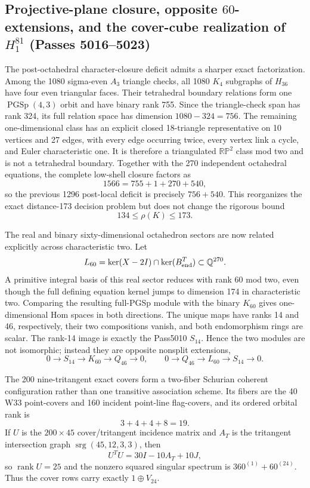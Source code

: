 \subsection*{Projective-plane closure, opposite $60$-extensions, and the cover-cube realization of $H_1^{81}$ (Passes 5016--5023)}
The post-octahedral character-closure deficit admits a sharper exact factorization.  Among the 1080 sigma-even $A_3$ triangle checks, all 1080 $K_4$ subgraphs of $H_{36}$ have four even triangular faces.  Their tetrahedral boundary relations form one $\operatorname{PGSp}(4,3)$ orbit and have binary rank 755.  Since the triangle-check span has rank 324, its full relation space has dimension $1080-324=756$.  The remaining one-dimensional class has an explicit closed 18-triangle representative on 10 vertices and 27 edges, with every edge occurring twice, every vertex link a cycle, and Euler characteristic one.  It is therefore a triangulated $\mathbb{RP}^2$ class mod two and is not a tetrahedral boundary.  Together with the 270 independent octahedral equations, the complete low-shell closure factors as
\[
1566=755+1+270+540,
\]
so the previous 1296 post-local deficit is precisely $756+540$.  This reorganizes the exact distance-173 decision problem but does not change the rigorous bound
\[
134\leq\rho(K)\leq173.
\]

The real and binary sixty-dimensional octahedron sectors are now related explicitly across characteristic two.  Let
\[
L_{60}=\ker(X-2I)\cap\ker(B_{\rm end}^{T})\subset\mathbb Q^{270}.
\]
A primitive integral basis of this real sector reduces with rank 60 mod two, even though the full defining equation kernel jumps to dimension 174 in characteristic two.  Comparing the resulting full-PGSp module with the binary $K_{60}$ gives one-dimensional Hom spaces in both directions.  The unique maps have ranks 14 and 46, respectively, their two compositions vanish, and both endomorphism rings are scalar.  The rank-14 image is exactly the Pass5010 $S_{14}$.  Hence the two modules are not isomorphic; instead they are opposite nonsplit extensions,
\[
0\to S_{14}\to K_{60}\to Q_{46}\to0,
\qquad
0\to Q_{46}\to L_{60}\to S_{14}\to0.
\]

The 200 nine-tritangent exact covers form a two-fiber Schurian coherent configuration rather than one transitive association scheme.  Its fibers are the 40 W33 point-covers and 160 incident point-line flag-covers, and its ordered orbital rank is
\[
3+4+4+8=19.
\]
If $U$ is the $200\times45$ cover/tritangent incidence matrix and $A_T$ is the tritangent intersection graph $\operatorname{srg}(45,12,3,3)$, then
\[
U^TU=30I-10A_T+10J,
\]
so $\operatorname{rank}U=25$ and the nonzero squared singular spectrum is $360^{(1)}+60^{(24)}$.  Thus the cover rows carry exactly $1\oplus V_{24}$.

